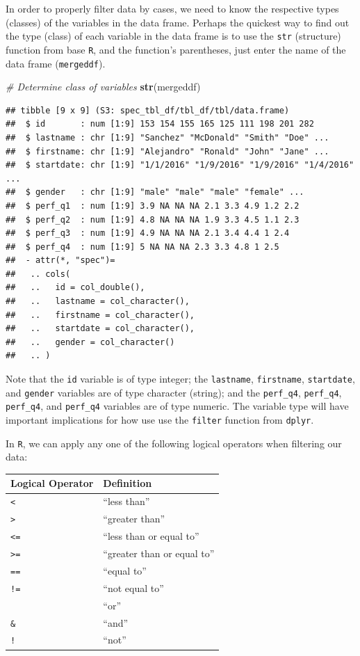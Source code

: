 \documentclass[]{book}
\newenvironment{Shaded}{\begin{snugshade}}{\end{snugshade}}
\newcommand{\KeywordTok}[1]{\textcolor[rgb]{0.13,0.29,0.53}{\textbf{#1}}}
\newcommand{\CommentTok}[1]{\textcolor[rgb]{0.56,0.35,0.01}{\textit{#1}}}
\newcommand{\NormalTok}[1]{#1}
\begin{document}
In order to properly filter data by cases, we need to know the
respective types (classes) of the variables in the data frame. Perhaps
the quickest way to find out the type (class) of each variable in the
data frame is to use the \texttt{str} (structure) function from base
\texttt{R}, and the function's parentheses, just enter the name of the
data frame (\texttt{mergeddf}).

\begin{Shaded}
\begin{Highlighting}[]
\CommentTok{# Determine class of variables}
\KeywordTok{str}\NormalTok{(mergeddf)}
\end{Highlighting}
\end{Shaded}

\begin{verbatim}
## tibble [9 x 9] (S3: spec_tbl_df/tbl_df/tbl/data.frame)
##  $ id       : num [1:9] 153 154 155 165 125 111 198 201 282
##  $ lastname : chr [1:9] "Sanchez" "McDonald" "Smith" "Doe" ...
##  $ firstname: chr [1:9] "Alejandro" "Ronald" "John" "Jane" ...
##  $ startdate: chr [1:9] "1/1/2016" "1/9/2016" "1/9/2016" "1/4/2016" ...
##  $ gender   : chr [1:9] "male" "male" "male" "female" ...
##  $ perf_q1  : num [1:9] 3.9 NA NA NA 2.1 3.3 4.9 1.2 2.2
##  $ perf_q2  : num [1:9] 4.8 NA NA NA 1.9 3.3 4.5 1.1 2.3
##  $ perf_q3  : num [1:9] 4.9 NA NA NA 2.1 3.4 4.4 1 2.4
##  $ perf_q4  : num [1:9] 5 NA NA NA 2.3 3.3 4.8 1 2.5
##  - attr(*, "spec")=
##   .. cols(
##   ..   id = col_double(),
##   ..   lastname = col_character(),
##   ..   firstname = col_character(),
##   ..   startdate = col_character(),
##   ..   gender = col_character()
##   .. )
\end{verbatim}

Note that the \texttt{id} variable is of type integer; the
\texttt{lastname}, \texttt{firstname}, \texttt{startdate}, and
\texttt{gender} variables are of type character (string); and the
\texttt{perf\_q4}, \texttt{perf\_q4}, \texttt{perf\_q4}, and
\texttt{perf\_q4} variables are of type numeric. The variable type will
have important implications for how use use the \texttt{filter} function
from \texttt{dplyr}.

In \texttt{R}, we can apply any one of the following logical operators
when filtering our data:

\begin{longtable}[]{@{}ll@{}}
\toprule
Logical Operator & Definition\tabularnewline
\midrule
\endhead
\texttt{\textless{}} & ``less than''\tabularnewline
\texttt{\textgreater{}} & ``greater than''\tabularnewline
\texttt{\textless{}=} & ``less than or equal to''\tabularnewline
\texttt{\textgreater{}=} & ``greater than or equal to''\tabularnewline
\texttt{==} & ``equal to''\tabularnewline
\texttt{!=} & ``not equal to''\tabularnewline
\texttt{\textbar{}} & ``or''\tabularnewline
\texttt{\&} & ``and''\tabularnewline
\texttt{!} & ``not''\tabularnewline
\bottomrule
\end{longtable}
\end{document}
